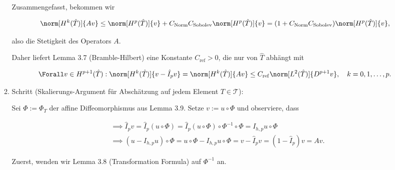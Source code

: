 \begin{solution}
\begin{enumerate}[label = \textbf{\alph*)}]
\begin{enumerate}[label = \arabic*.]
      Zusammengefasst, bekommen wir

      \begin{align*}
        \norm[H^k(\hat T)]{A v}
        \leq
        \norm[H^p(\hat T)]{v}
        +
        C_\mathrm{Norm}
        C_\mathrm{Sobolev}
        \norm[H^p(\hat T)]{v}
        =
        (1 + C_\mathrm{Norm} C_\mathrm{Sobolev})
        \norm[H^p(\hat T)]{v},
      \end{align*}

      also die Stetigkeit des Operators $A$.


      Daher liefert Lemma 3.7 (Bramble-Hilbert) eine Konstante $C_\mathrm{ref} > 0$, die nur von $\hat T$ abhängt mit

      \begin{align*}
        \Forall v \in H^{p+1}(\hat T):
        \norm[H^k(\hat T)]{v - \hat I_p v}
        =
        \norm[H^k(\hat T)]{A v}
        \leq
        C_\mathrm{ref}
        \norm[L^2(\hat T)]{D^{p+1} v},
        \quad
        k = 0, 1, \dots, p.
      \end{align*}

      \item Schritt (Skalierungs-Argument für Abschätzung auf jedem Element $T \in \mathcal{T}$):

      Sei $\Phi := \Phi_T$ der affine Diffeomorphismus aus Lemma 3.9.
      Setze $v := u \circ \Phi$ und observiere, dass

      \begin{align*}
        & \implies
        \hat I_p v
        =
        \hat I_p (u \circ \Phi)
        =
        \hat I_p (u \circ \Phi) \circ \Phi^{-1} \circ \Phi
        =
        I_{h, p} u \circ \Phi \\
        & \implies
        (u - I_{h, p} u) \circ \Phi
        =
        u \circ \Phi - I_{h, p} u \circ \Phi
        =
        v - \hat I_p v
        =
        (1 - \hat I_p) v
        =
        A v.
      \end{align*}

      Zuerst, wenden wir Lemma 3.8 (Transformation Formula) auf $\Phi^{-1}$ an.



\end{enumerate}
\end{enumerate}
\end{solution}
